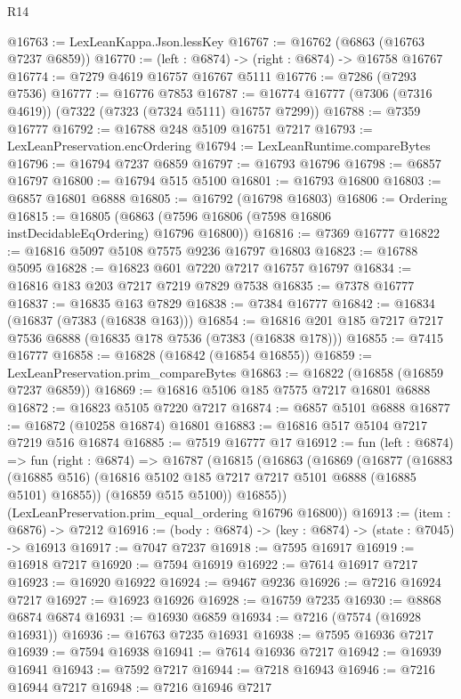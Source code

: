 \begin{lexlean}{R14}
\begin{coremodule}
@16763 := LexLeanKappa.Json.lessKey
@16767 := @16762 (@6863 (@16763 @7237 @6859))
@16770 := (left : @6874) -> (right : @6874) -> @16758 @16767
@16774 := @7279 @4619 @16757 @16767 @5111
@16776 := @7286 (@7293 @7536)
@16777 := @16776 @7853
@16787 := @16774 @16777 (@7306 (@7316 @4619)) (@7322 (@7323 (@7324 @5111) @16757 @7299))
@16788 := @7359 @16777
@16792 := @16788 @248 @5109 @16751 @7217
@16793 := LexLeanPreservation.encOrdering
@16794 := LexLeanRuntime.compareBytes
@16796 := @16794 @7237 @6859
@16797 := @16793 @16796
@16798 := @6857 @16797
@16800 := @16794 @515 @5100
@16801 := @16793 @16800
@16803 := @6857 @16801 @6888
@16805 := @16792 (@16798 @16803)
@16806 := Ordering
@16815 := @16805 (@6863 (@7596 @16806 (@7598 @16806 instDecidableEqOrdering) @16796 @16800))
@16816 := @7369 @16777
@16822 := @16816 @5097 @5108 @7575 @9236 @16797 @16803
@16823 := @16788 @5095
@16828 := @16823 @601 @7220 @7217 @16757 @16797
@16834 := @16816 @183 @203 @7217 @7219 @7829 @7538
@16835 := @7378 @16777
@16837 := @16835 @163 @7829
@16838 := @7384 @16777
@16842 := @16834 (@16837 (@7383 (@16838 @163)))
@16854 := @16816 @201 @185 @7217 @7217 @7536 @6888 (@16835 @178 @7536 (@7383 (@16838 @178)))
@16855 := @7415 @16777
@16858 := @16828 (@16842 (@16854 @16855))
@16859 := LexLeanPreservation.prim_compareBytes
@16863 := @16822 (@16858 (@16859 @7237 @6859))
@16869 := @16816 @5106 @185 @7575 @7217 @16801 @6888
@16872 := @16823 @5105 @7220 @7217
@16874 := @6857 @5101 @6888
@16877 := @16872 (@10258 @16874) @16801
@16883 := @16816 @517 @5104 @7217 @7219 @516 @16874
@16885 := @7519 @16777 @17
@16912 := fun (left : @6874) =>
  fun (right : @6874) =>
  @16787
    (@16815
      (@16863
        (@16869
          (@16877
            (@16883 (@16885 @516) (@16816 @5102 @185 @7217 @7217 @5101 @6888 (@16885 @5101) @16855))
            (@16859 @515 @5100))
          @16855))
      (LexLeanPreservation.prim_equal_ordering @16796 @16800))
@16913 := (item : @6876) -> @7212
@16916 := (body : @6874) -> (key : @6874) -> (state : @7045) -> @16913
@16917 := @7047 @7237
@16918 := @7595 @16917
@16919 := @16918 @7217
@16920 := @7594 @16919
@16922 := @7614 @16917 @7217
@16923 := @16920 @16922
@16924 := @9467 @9236
@16926 := @7216 @16924 @7217
@16927 := @16923 @16926
@16928 := @16759 @7235
@16930 := @8868 @6874 @6874
@16931 := @16930 @6859
@16934 := @7216 (@7574 (@16928 @16931))
@16936 := @16763 @7235 @16931
@16938 := @7595 @16936 @7217
@16939 := @7594 @16938
@16941 := @7614 @16936 @7217
@16942 := @16939 @16941
@16943 := @7592 @7217
@16944 := @7218 @16943
@16946 := @7216 @16944 @7217
@16948 := @7216 @16946 @7217

\end{coremodule}
\end{lexlean}
